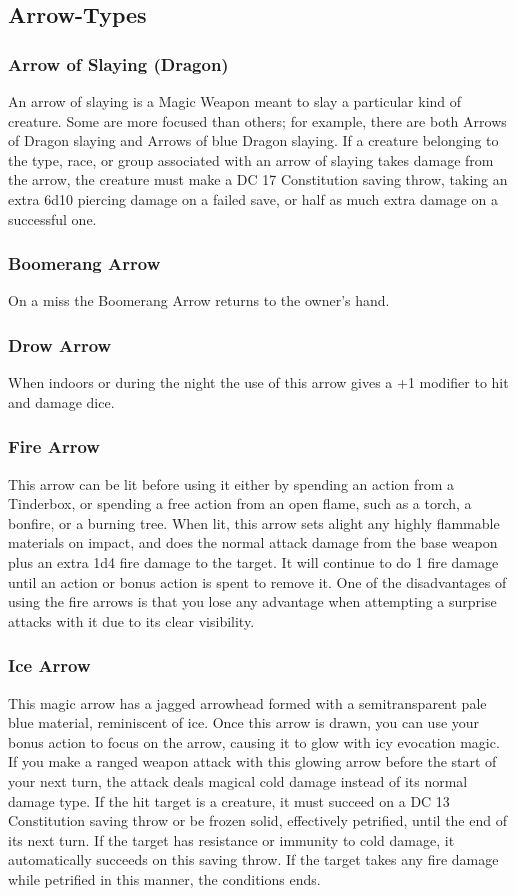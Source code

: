 \documentclass[letterpaper,openany,oneside,twocolumn]{book}
\begin{document}
\subsection*{Arrow-Types}
\subsubsection*{Arrow of Slaying (Dragon)}
An arrow of slaying is a Magic Weapon meant to slay a particular kind of creature. Some are more focused than others; for example, there are both Arrows of Dragon slaying and Arrows of blue Dragon slaying. If a creature belonging to the type, race, or group associated with an arrow of slaying takes damage from the arrow, the creature must make a DC 17 Constitution saving throw, taking an extra 6d10 piercing damage on a failed save, or half as much extra damage on a successful one.
\subsubsection*{Boomerang Arrow}
On a miss the Boomerang Arrow returns to the owner's hand.
\subsubsection*{Drow Arrow}
When indoors or during the night the use of this arrow gives a +1 modifier to hit and damage dice.
\subsubsection*{Fire Arrow}
This arrow can be lit before using it either by spending an action from a Tinderbox, or spending a free action from an open flame, such as a torch, a bonfire, or a burning tree. When lit, this arrow sets alight any highly flammable materials on impact, and does the normal attack damage from the base weapon plus an extra 1d4 fire damage to the target. It will continue to do 1 fire damage until an action or bonus action is spent to remove it. One of the disadvantages of using the fire arrows is that you lose any advantage when attempting a surprise attacks with it due to its clear visibility.
\subsubsection*{Ice Arrow}
This magic arrow has a jagged arrowhead formed with a semitransparent pale blue material, reminiscent of ice. Once this arrow is drawn, you can use your bonus action to focus on the arrow, causing it to glow with icy evocation magic. If you make a ranged weapon attack with this glowing arrow before the start of your next turn, the attack deals magical cold damage instead of its normal damage type. If the hit target is a creature, it must succeed on a DC 13 Constitution saving throw or be frozen solid, effectively petrified, until the end of its next turn. If the target has resistance or immunity to cold damage, it automatically succeeds on this saving throw. If the target takes any fire damage while petrified in this manner, the conditions ends.
\end{document}
